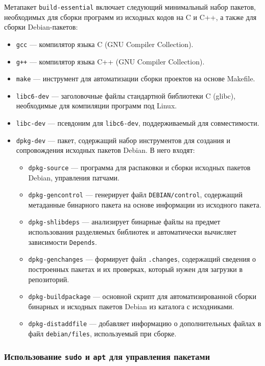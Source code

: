 Метапакет \texttt{build-essential} включает следующий минимальный набор пакетов, необходимых для сборки программ из исходных кодов на C и C++, а также для сборки Debian-пакетов:

\begin{itemize}
    \item \texttt{gcc} --- компилятор языка C (GNU Compiler Collection).
    \item \texttt{g++} --- компилятор языка C++ (GNU Compiler Collection).
    \item \texttt{make} --- инструмент для автоматизации сборки проектов на основе Makefile.
    \item \texttt{libc6-dev} --- заголовочные файлы стандартной библиотеки C (glibc), необходимые для компиляции программ под Linux.
    \item \texttt{libc-dev} --- псевдоним для \texttt{libc6-dev}, поддерживаемый для совместимости.
    \item \texttt{dpkg-dev} --- пакет, содержащий набор инструментов для создания и сопровождения исходных пакетов Debian. В него входят:
    \begin{itemize}
        \item \texttt{dpkg-source} --- программа для распаковки и сборки исходных пакетов Debian, управления патчами.
        \item \texttt{dpkg-gencontrol} --- генерирует файл \texttt{DEBIAN/control}, содержащий метаданные бинарного пакета на основе информации из исходного пакета.
        \item \texttt{dpkg-shlibdeps} --- анализирует бинарные файлы на предмет использования разделяемых библиотек и автоматически вычисляет зависимости \texttt{Depends}.
        \item \texttt{dpkg-genchanges} --- формирует файл \texttt{.changes}, содержащий сведения о построенных пакетах и их проверках, который нужен для загрузки в репозиторий.
        \item \texttt{dpkg-buildpackage} --- основной скрипт для автоматизированной сборки бинарных и исходных пакетов Debian из каталога с исходниками.
        \item \texttt{dpkg-distaddfile} --- добавляет информацию о дополнительных файлах в файл \texttt{debian/files}, используемый при сборке.
    \end{itemize}
\end{itemize}

\subsubsection*{Использование \texttt{sudo} и \texttt{apt} для управления пакетами}

